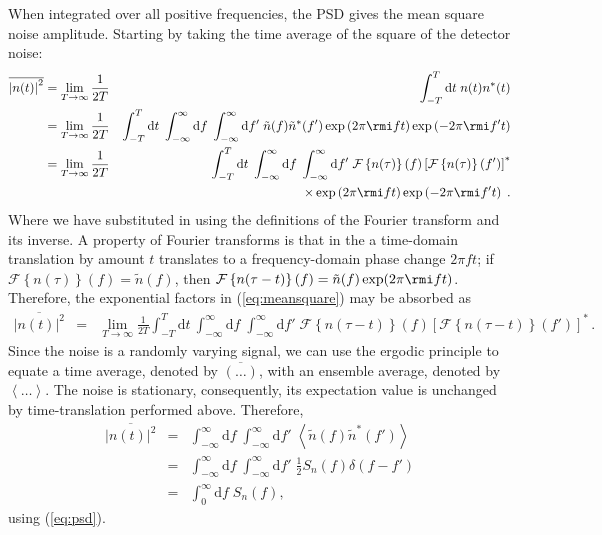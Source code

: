When integrated over all positive frequencies, the PSD gives the mean square noise amplitude. Starting by taking the time average of the square of the detector noise:
\begin{eqnarray}\label{eq:meansquare}
\overline{\left|n(t)\right|^{2}} &= \lim_{T\rightarrow\infty}\frac{1}{2T} & \int_{-T}^{T}\mathrm{d}t\; n(t)n^{*}(t) \\
 &= \lim_{T\rightarrow\infty}\frac{1}{2T} & \int_{-T}^{T}\mathrm{d}t\; \int_{-\infty}^{\infty}\mathrm{d}f\;\int_{-\infty}^{\infty}\mathrm{d}f'\;\tilde{n}(f)\tilde{n}^{*}(f')\exp\left(2\pi \rmi ft\right)\exp\left(-2\pi \rmi f't\right) \nonumber\\
 &= \lim_{T\rightarrow\infty}\frac{1}{2T} & \int_{-T}^{T}\mathrm{d}t\; \int_{-\infty}^{\infty}\mathrm{d}f\;\int_{-\infty}^{\infty}\mathrm{d}f'\;{\mathcal{F}}\left\{ n(\tau) \right\}(f)\left[{\mathcal{F}}\left\{ n(\tau) \right\}(f')\right]^{*} \nonumber \\*
 & & \times \exp\left(2\pi \rmi ft\right)\exp\left(-2\pi \rmi f't\right)\;.
\end{eqnarray}
Where we have substituted in using the definitions of the Fourier transform and its inverse. A property of Fourier transforms is that in the a time-domain translation by amount $t$ translates to a frequency-domain phase change $2\pi ft$; if ${\mathcal{F}}\left\{ n(\tau) \right\}(f) = \tilde{n}(f)$, then ${\mathcal{F}}\left\{ n(\tau-t) \right\}(f) = \tilde{n}(f)\exp (2\pi \rmi ft )$. Therefore, the exponential factors in (\ref{eq:meansquare}) may be absorbed as
\begin{eqnarray}
\overline{\left|n(t)\right|^{2}} &=& \lim_{T\rightarrow\infty}\frac{1}{2T}\int_{-T}^{T} \mathrm{d}t\:\int_{-\infty}^{\infty}\mathrm{d}f\;\int_{-\infty}^{\infty}\mathrm{d}f'\;{\mathcal{F}}\left\{ n(\tau-t) \right\}(f)\left[{\mathcal{F}}\left\{ n(\tau-t) \right\}(f')\right]^{*} \, .
\end{eqnarray}
Since the noise is a randomly varying signal, we can use the ergodic principle to equate a time average, denoted by $\overline{\left(\ldots\right)}$, with an ensemble average, denoted by $\left<\ldots\right>$. The noise is stationary, consequently, its expectation value is unchanged by time-translation performed above. Therefore,
\begin{eqnarray}\label{eq:meansquare1}
\overline{\left|n(t)\right|^{2}} &=& \int_{-\infty}^{\infty}\mathrm{d}f\;\int_{-\infty}^{\infty}\mathrm{d}f'\;\left<\tilde{n}(f)\tilde{n}^{*}(f')\right> \\
&=& \int_{-\infty}^{\infty}\mathrm{d}f\;\int_{-\infty}^{\infty}\mathrm{d}f'\;\frac{1}{2}S_{n}(f)\delta(f-f') \nonumber \\
&=& \int_{0}^{\infty}\mathrm{d}f\; S_{n}(f),
\end{eqnarray}
using (\ref{eq:psd}).

